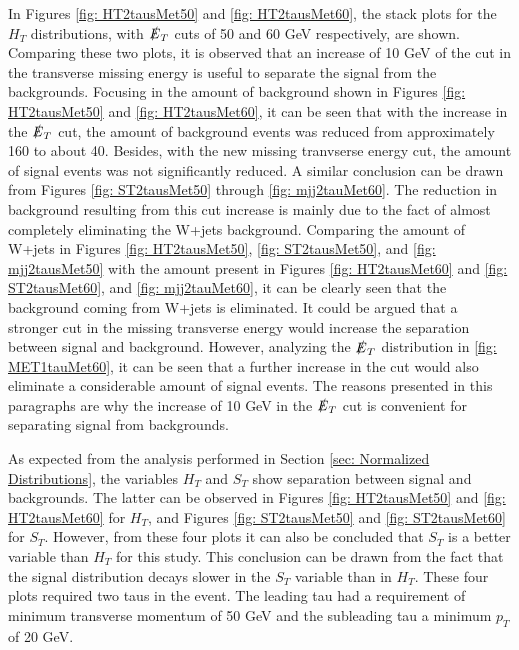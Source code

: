 In Figures \ref{fig: HT2tausMet50} and \ref{fig: HT2tausMet60}, the stack plots for the $H_{T}$ distributions, with $\slashed{E}_{T}$ cuts of 50 and 60 GeV respectively, are shown. Comparing these two plots, it is observed that an increase of 10 GeV of the cut in the transverse missing energy is useful to separate the signal from the backgrounds. Focusing in the amount of background shown in Figures \ref{fig: HT2tausMet50} and \ref{fig: HT2tausMet60}, it can be seen that with the increase in the $\slashed{E}_{T}$ cut, the amount of background events was reduced from approximately 160 to about 40. Besides, with the new missing tranvserse energy cut, the amount of signal events was not significantly reduced. A similar conclusion can be drawn from Figures \ref{fig: ST2tausMet50} through \ref{fig: mjj2tauMet60}. The reduction in background resulting from this cut increase is mainly due to the fact of almost completely eliminating the W+jets background. Comparing the amount of W+jets in Figures \ref{fig: HT2tausMet50}, \ref{fig: ST2tausMet50}, and \ref{fig: mjj2tausMet50} with the amount present in Figures \ref{fig: HT2tausMet60} and \ref{fig: ST2tausMet60}, and \ref{fig: mjj2tauMet60}, it can be clearly seen that the background coming from W+jets is eliminated. It could be argued that a stronger cut in the missing transverse energy would increase the separation between signal and background. However, analyzing the $\slashed{E}_{T}$ distribution in \ref{fig: MET1tauMet60}, it can be seen that a further increase in the cut would also eliminate a considerable amount of signal events. The reasons presented in this paragraphs are why the increase of 10 GeV in the $\slashed{E}_{T}$ cut is convenient for separating signal from backgrounds.


As expected from the analysis performed in Section \ref{sec: Normalized Distributions}, the variables $H_{T}$ and $S_{T}$ show separation between signal and backgrounds. The latter can be observed in Figures \ref{fig: HT2tausMet50} and \ref{fig: HT2tausMet60} for $H_{T}$, and Figures \ref{fig: ST2tausMet50} and \ref{fig: ST2tausMet60} for $S_{T}$. However, from these four plots it can also be concluded that $S_{T}$ is a better variable than $H_{T}$ for this study. This conclusion can be drawn from the fact that the signal distribution decays slower in the $S_{T}$ variable than in $H_{T}$. These four plots required two taus in the event. The leading tau had a requirement of minimum transverse momentum of 50 GeV and the subleading tau a minimum $p_{T}$ of 20 GeV.

